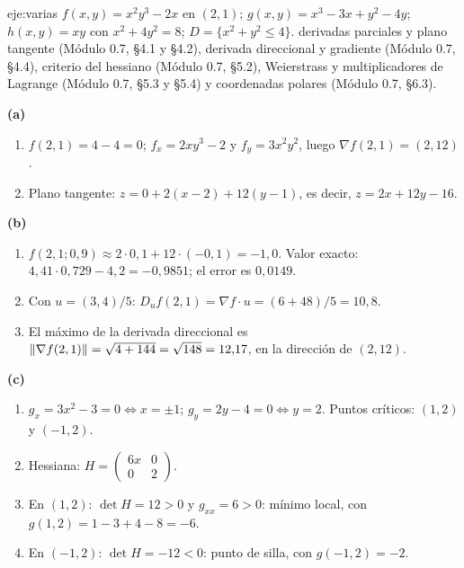 \begin{solucion}{eje:varias}
\datos $f(x,y)=x^{2}y^{3}-2x$ en $(2,1)$; $g(x,y)=x^{3}-3x+y^{2}-4y$; $h(x,y)=xy$ con $x^{2}+4y^{2}=8$; $D=\{x^{2}+y^{2}\le4\}$.
\planteamiento derivadas parciales y plano tangente (Módulo 0.7, §4.1 y §4.2), derivada direccional y gradiente (Módulo 0.7, §4.4), criterio del hessiano (Módulo 0.7, §5.2), Weierstrass y multiplicadores de Lagrange (Módulo 0.7, §5.3 y §5.4) y coordenadas polares (Módulo 0.7, §6.3).
\pasos

\noindent\textbf{(a)}
\begin{enumerate}[label=\arabic*.]
  \item $f(2,1)=4-4=0$; $f_x=2xy^{3}-2$ y $f_y=3x^{2}y^{2}$, luego $\nabla f(2,1)=(2,12)$.
  \item Plano tangente: $z=0+2(x-2)+12(y-1)$, es decir, $z=2x+12y-16$.
\end{enumerate}

\noindent\textbf{(b)}
\begin{enumerate}[label=\arabic*.]
  \item $f(2{,}1;0{,}9)\approx2\cdot0{,}1+12\cdot(-0{,}1)=-1{,}0$. Valor exacto: $4{,}41\cdot0{,}729-4{,}2=-0{,}9851$; el error es $0{,}0149$.
  \item Con $u=(3,4)/5$: $D_uf(2,1)=\nabla f\cdot u=(6+48)/5=10{,}8$.
  \item El máximo de la derivada direccional es $\lVert\nabla f(2,1)\rVert=\sqrt{4+144}=\sqrt{148}=12{,}17$, en la dirección de $(2,12)$.
\end{enumerate}

\noindent\textbf{(c)}
\begin{enumerate}[label=\arabic*.]
  \item $g_x=3x^{2}-3=0\iff x=\pm1$; $g_y=2y-4=0\iff y=2$. Puntos críticos: $(1,2)$ y $(-1,2)$.
  \item Hessiana: $H=\begin{pmatrix}6x&0\\0&2\end{pmatrix}$.
  \item En $(1,2)$: $\det H=12>0$ y $g_{xx}=6>0$: mínimo local, con $g(1,2)=1-3+4-8=-6$.
  \item En $(-1,2)$: $\det H=-12<0$: punto de silla, con $g(-1,2)=-2$.
\end{enumerate}


\end{solucion}
